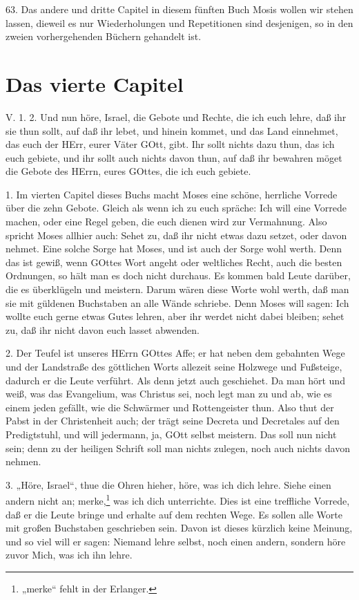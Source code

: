 63. Das andere und dritte Capitel in diesem fünften Buch Mosis wollen wir stehen lassen, dieweil es nur Wiederholungen und Repetitionen sind desjenigen, so in den zweien vorhergehenden Büchern gehandelt ist.

\section{Das vierte Capitel}

\begin{schriftzitat}
V. 1. 2. Und nun höre, Israel, die Gebote und Rechte, die ich euch lehre, daß ihr sie thun sollt, auf daß ihr lebet, und hinein kommet, und das Land einnehmet, das euch der HErr, eurer Väter GOtt, gibt. Ihr sollt nichts dazu thun, das ich euch gebiete, und ihr sollt auch nichts davon thun, auf daß ihr bewahren möget die Gebote des HErrn, eures GOttes, die ich euch gebiete.
\end{schriftzitat}

1. Im vierten Capitel dieses Buchs macht Moses eine schöne, herrliche Vorrede über die zehn Gebote. Gleich als wenn ich zu euch spräche: Ich will eine Vorrede machen, oder eine Regel geben, die euch dienen wird zur Vermahnung. Also spricht Moses allhier auch: Sehet zu, daß ihr nicht etwas dazu setzet, oder davon nehmet. Eine solche Sorge hat Moses, und ist auch der Sorge wohl werth. Denn das ist gewiß, wenn GOttes Wort angeht oder weltliches Recht, auch die besten Ordnungen, so hält man es doch nicht durchaus. Es kommen bald Leute darüber, die es überklügeln und meistern. Darum wären diese Worte wohl werth, daß man sie mit güldenen Buchstaben an alle Wände schriebe. Denn Moses will sagen: Ich wollte euch gerne etwas Gutes lehren, aber ihr werdet nicht dabei bleiben; sehet zu, daß ihr nicht davon euch lasset abwenden.

2. Der Teufel ist unseres HErrn GOttes Affe; er hat neben dem gebahnten Wege und der Landstraße des göttlichen Worts allezeit seine Holzwege und Fußsteige, dadurch er die Leute verführt. Als denn jetzt auch geschiehet. Da man hört und weiß, was das Evangelium, was Christus sei, noch legt man zu und ab, wie es einem jeden gefällt, wie die Schwärmer und Rottengeister thun. Also thut der Pabst in der Christenheit auch; der trägt seine Decreta und Decretales auf den Predigtstuhl, und will jedermann, ja, GOtt selbst meistern. Das soll nun nicht sein; denn zu der heiligen Schrift soll man nichts zulegen, noch auch nichts davon nehmen.

3. „Höre, Israel“, thue die Ohren hieher, höre, was ich dich lehre. Siehe einen andern nicht an; merke,\footnote{„merke“ fehlt in der Erlanger.} was ich dich unterrichte. Dies ist eine treffliche Vorrede, daß er die Leute bringe
und erhalte auf dem rechten Wege. Es sollen alle Worte mit großen Buchstaben geschrieben sein. Davon ist dieses kürzlich keine Meinung, und so viel will er sagen: Niemand lehre selbst, noch einen andern, sondern höre zuvor Mich, was ich ihn lehre.

